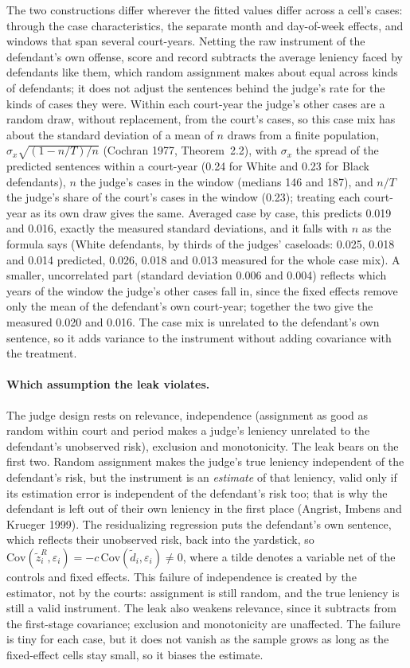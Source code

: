 \documentclass[11pt]{article}
\begin{document}
The two constructions differ wherever the fitted values differ across a cell's cases: through the case characteristics, the separate month and day-of-week effects, and windows that span several court-years. Netting the raw instrument of the defendant's own offense, score and record subtracts the average leniency faced by defendants like them, which random assignment makes about equal across kinds of defendants; it does not adjust the sentences behind the judge's rate for the kinds of cases they were. Within each court-year the judge's other cases are a random draw, without replacement, from the court's cases, so this case mix has about the standard deviation of a mean of $n$ draws from a finite population, $\sigma_x\sqrt{(1-n/T)/n}$ (Cochran 1977, Theorem~2.2), with $\sigma_x$ the spread of the predicted sentences within a court-year (0.24 for White and 0.23 for Black defendants), $n$ the judge's cases in the window (medians 146 and 187), and $n/T$ the judge's share of the court's cases in the window (0.23); treating each court-year as its own draw gives the same. Averaged case by case, this predicts 0.019 and 0.016, exactly the measured standard deviations, and it falls with $n$ as the formula says (White defendants, by thirds of the judges' caseloads: 0.025, 0.018 and 0.014 predicted, 0.026, 0.018 and 0.013 measured for the whole case mix). A smaller, uncorrelated part (standard deviation 0.006 and 0.004) reflects which years of the window the judge's other cases fall in, since the fixed effects remove only the mean of the defendant's own court-year; together the two give the measured 0.020 and 0.016. The case mix is unrelated to the defendant's own sentence, so it adds variance to the instrument without adding covariance with the treatment.

\paragraph{Which assumption the leak violates.} The judge design rests on relevance, independence (assignment as good as random within court and period makes a judge's leniency unrelated to the defendant's unobserved risk), exclusion and monotonicity. The leak bears on the first two. Random assignment makes the judge's true leniency independent of the defendant's risk, but the instrument is an \emph{estimate} of that leniency, valid only if its estimation error is independent of the defendant's risk too; that is why the defendant is left out of their own leniency in the first place (Angrist, Imbens and Krueger 1999). The residualizing regression puts the defendant's own sentence, which reflects their unobserved risk, back into the yardstick, so $\mathrm{Cov}(\tilde z^R_i, \varepsilon_i) = -c\,\mathrm{Cov}(\tilde d_i, \varepsilon_i) \neq 0$, where a tilde denotes a variable net of the controls and fixed effects. This failure of independence is created by the estimator, not by the courts: assignment is still random, and the true leniency is still a valid instrument. The leak also weakens relevance, since it subtracts from the first-stage covariance; exclusion and monotonicity are unaffected. The failure is tiny for each case, but it does not vanish as the sample grows as long as the fixed-effect cells stay small, so it biases the estimate.
\end{document}
